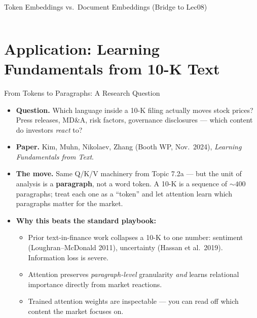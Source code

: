 \begin{frame}{Token Embeddings vs.\ Document Embeddings (Bridge to Lec08)}
\begin{columns}[T]
\end{columns}
\end{frame}

\appendix

\section{Application: Learning Fundamentals from 10-K Text}

\begin{frame}{From Tokens to Paragraphs: A Research Question}
\begin{itemize}
\item \textbf{Question.} Which language inside a 10-K filing actually moves stock prices? Press releases, MD\&A, risk factors, governance disclosures --- which content do investors \emph{react} to?

\medskip
\item \textbf{Paper.} Kim, Muhn, Nikolaev, Zhang (Booth WP, Nov.\ 2024), \emph{Learning Fundamentals from Text}.

\medskip
\item \textbf{The move.} Same Q/K/V machinery from Topic 7.2a --- but the unit of analysis is a \textbf{paragraph}, not a word token. A 10-K is a sequence of $\sim 400$ paragraphs; treat each one as a ``token'' and let attention learn which paragraphs matter for the market.

\medskip
\item \textbf{Why this beats the standard playbook:}
\begin{itemize}
    \item Prior text-in-finance work collapses a 10-K to one number: sentiment (Loughran--McDonald 2011), uncertainty (Hassan et al.\ 2019). Information loss is severe.
    \item Attention preserves \emph{paragraph-level} granularity \emph{and} learns relational importance directly from market reactions.
    \item Trained attention weights are inspectable --- you can read off which content the market focuses on.
\end{itemize}
\end{itemize}
\end{frame}

